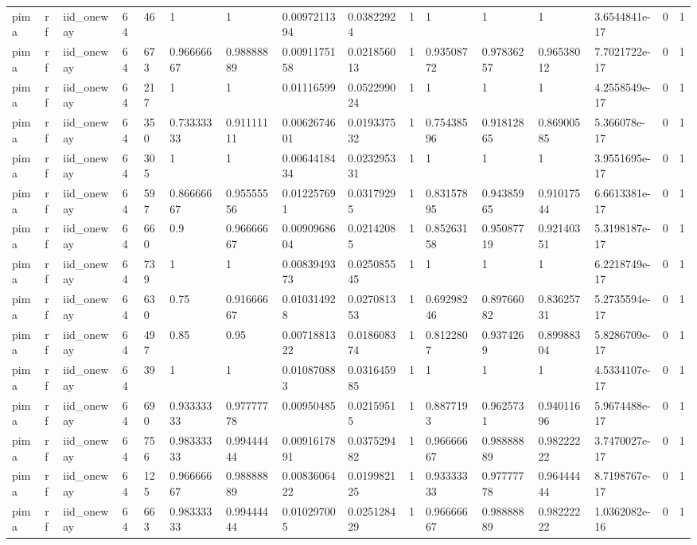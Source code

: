 \begin{tabular}{llllllllllllllll}
pima & rf & iid\_oneway & 64 & 46 & 1 & 1 & 0.0097211394 & 0.03822924 & 1 & 1 & 1 & 1 & 3.6544841e-17 & 0 & 1 \\
pima & rf & iid\_oneway & 64 & 673 & 0.96666667 & 0.98888889 & 0.0091175158 & 0.021856013 & 1 & 0.93508772 & 0.97836257 & 0.96538012 & 7.7021722e-17 & 0 & 1 \\
pima & rf & iid\_oneway & 64 & 217 & 1 & 1 & 0.01116599 & 0.052299024 & 1 & 1 & 1 & 1 & 4.2558549e-17 & 0 & 1 \\
pima & rf & iid\_oneway & 64 & 350 & 0.73333333 & 0.91111111 & 0.0062674601 & 0.019337532 & 1 & 0.75438596 & 0.91812865 & 0.86900585 & 5.366078e-17 & 0 & 1 \\
pima & rf & iid\_oneway & 64 & 305 & 1 & 1 & 0.0064418434 & 0.023295331 & 1 & 1 & 1 & 1 & 3.9551695e-17 & 0 & 1 \\
pima & rf & iid\_oneway & 64 & 597 & 0.86666667 & 0.95555556 & 0.012257691 & 0.03179295 & 1 & 0.83157895 & 0.94385965 & 0.91017544 & 6.6613381e-17 & 0 & 1 \\
pima & rf & iid\_oneway & 64 & 660 & 0.9 & 0.96666667 & 0.0090968604 & 0.02142085 & 1 & 0.85263158 & 0.95087719 & 0.92140351 & 5.3198187e-17 & 0 & 1 \\
pima & rf & iid\_oneway & 64 & 739 & 1 & 1 & 0.0083949373 & 0.025085545 & 1 & 1 & 1 & 1 & 6.2218749e-17 & 0 & 1 \\
pima & rf & iid\_oneway & 64 & 630 & 0.75 & 0.91666667 & 0.010314928 & 0.027081353 & 1 & 0.69298246 & 0.89766082 & 0.83625731 & 5.2735594e-17 & 0 & 1 \\
pima & rf & iid\_oneway & 64 & 497 & 0.85 & 0.95 & 0.0071881322 & 0.018608374 & 1 & 0.8122807 & 0.9374269 & 0.89988304 & 5.8286709e-17 & 0 & 1 \\
pima & rf & iid\_oneway & 64 & 39 & 1 & 1 & 0.010870883 & 0.031645985 & 1 & 1 & 1 & 1 & 4.5334107e-17 & 0 & 1 \\
pima & rf & iid\_oneway & 64 & 690 & 0.93333333 & 0.97777778 & 0.00950485 & 0.02159515 & 1 & 0.8877193 & 0.9625731 & 0.94011696 & 5.9674488e-17 & 0 & 1 \\
pima & rf & iid\_oneway & 64 & 756 & 0.98333333 & 0.99444444 & 0.0091617891 & 0.037529482 & 1 & 0.96666667 & 0.98888889 & 0.98222222 & 3.7470027e-17 & 0 & 1 \\
pima & rf & iid\_oneway & 64 & 125 & 0.96666667 & 0.98888889 & 0.0083606422 & 0.019982125 & 1 & 0.93333333 & 0.97777778 & 0.96444444 & 8.7198767e-17 & 0 & 1 \\
pima & rf & iid\_oneway & 64 & 663 & 0.98333333 & 0.99444444 & 0.010297005 & 0.025128429 & 1 & 0.96666667 & 0.98888889 & 0.98222222 & 1.0362082e-16 & 0 & 1 \\

\end{tabular}
